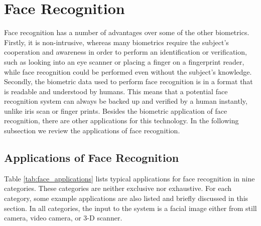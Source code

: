 \section{Face Recognition}
Face recognition has a number of advantages
over some of the other biometrics. Firstly, it is non-intrusive,
whereas many biometrics require the subject's cooperation and
awareness in order to perform an identification or verification,
such as looking into an eye scanner or placing a finger on a
fingerprint reader, while face recognition could be performed even
without the subject's knowledge. Secondly, the biometric data used
to perform face recognition is in a format that is readable and
understood by humans. This means that a potential face recognition
system can always be backed up and verified by a human instantly,
unlike iris scan or finger prints. Besides the biometric application
of face recognition, there are other applications for this
technology. In the following subsection we review the applications
of face recognition.

\subsection{Applications of Face Recognition}
Table \ref{tab:face_applications} lists typical applications for
face recognition in nine categories. These categories are neither
exclusive nor exhaustive. For each category, some example
applications are also listed and briefly discussed in this section.
In all categories, the input to the system is a facial image either
from still camera, video camera, or 3-D scanner.

